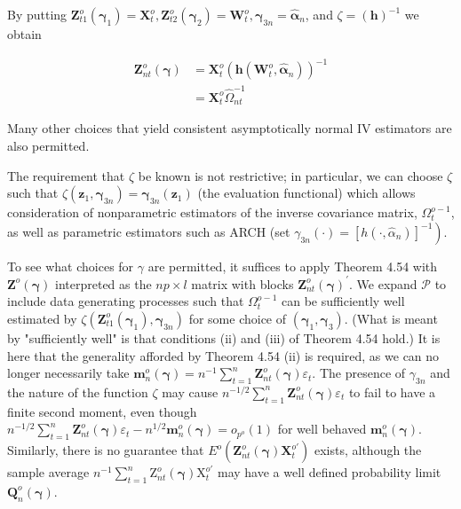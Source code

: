 \documentclass[10pt]{article}
\begin{document}
By putting $\mathbf{Z}_{t 1}^{o}\left(\boldsymbol{\gamma}_{1}\right)=\mathbf{X}_{t}^{o}, \mathbf{Z}_{t 2}^{o}\left(\boldsymbol{\gamma}_{2}\right)=\mathbf{W}_{t}^{o}, \boldsymbol{\gamma}_{3 n}=\hat{\boldsymbol{\alpha}}_{n}$, and $\zeta=(\mathbf{h})^{-1}$ we obtain

$$
\begin{aligned}
\mathbf{Z}_{n t}^{o}(\boldsymbol{\gamma}) & =\mathbf{X}_{t}^{o}\left(\mathbf{h}\left(\mathbf{W}_{t}^{o}, \hat{\boldsymbol{\alpha}}_{n}\right)\right)^{-1} \\
& =\mathbf{X}_{t}^{o} \hat{\Omega}_{n t}^{-1}
\end{aligned}
$$

Many other choices that yield consistent asymptotically normal IV estimators are also permitted.

The requirement that $\zeta$ be known is not restrictive; in particular, we can choose $\zeta$ such that $\zeta\left(\mathbf{z}_{1}, \boldsymbol{\gamma}_{3 n}\right)=\boldsymbol{\gamma}_{3 n}\left(\mathbf{z}_{1}\right)$ (the evaluation functional) which allows consideration of nonparametric estimators of the inverse covariance matrix, $\Omega_{t}^{o-1}$, as well as parametric estimators such as ARCH (set $\gamma_{3 n}(\cdot)= \left.\left[h\left(\cdot, \hat{\alpha}_{n}\right)\right]^{-1}\right)$.

To see what choices for $\gamma$ are permitted, it suffices to apply Theorem 4.54 with $\mathbf{Z}^{o}(\boldsymbol{\gamma})$ interpreted as the $n p \times l$ matrix with blocks $\mathbf{Z}_{n t}^{o}(\boldsymbol{\gamma})^{\prime}$. We expand $\mathcal{P}$ to include data generating processes such that $\Omega_{t}^{o-1}$ can be sufficiently well estimated by $\zeta\left(\mathbf{Z}_{t 1}^{o}\left(\boldsymbol{\gamma}_{1}\right), \boldsymbol{\gamma}_{3 n}\right)$ for some choice of $\left(\boldsymbol{\gamma}_{1}, \boldsymbol{\gamma}_{3}\right)$. (What is meant by "sufficiently well" is that conditions (ii) and (iii) of Theorem 4.54 hold.) It is here that the generality afforded by Theorem 4.54 (ii) is required, as we can no longer necessarily take $\mathbf{m}_{n}^{o}(\boldsymbol{\gamma})= n^{-1} \sum_{t=1}^{n} \mathbf{Z}_{n t}^{o}(\boldsymbol{\gamma}) \varepsilon_{t}$. The presence of $\gamma_{3 n}$ and the nature of the function $\zeta$ may cause $n^{-1 / 2} \sum_{t=1}^{n} \mathbf{Z}_{n t}^{o}(\boldsymbol{\gamma}) \varepsilon_{t}$ to fail to have a finite second moment, even though $n^{-1 / 2} \sum_{t=1}^{n} \mathbf{Z}_{n t}^{o}(\boldsymbol{\gamma}) \varepsilon_{t}-n^{1 / 2} \mathbf{m}_{n}^{o}(\boldsymbol{\gamma})=o_{p^{o}}(1)$ for well behaved $\mathbf{m}_{n}^{o}(\boldsymbol{\gamma})$. Similarly, there is no guarantee that $E^{o}\left(\mathbf{Z}_{n t}^{o}(\boldsymbol{\gamma}) \mathbf{X}_{t}^{o \prime}\right)$ exists, although the sample average $n^{-1} \sum_{t=1}^{n} \mathrm{Z}_{n t}^{o}(\boldsymbol{\gamma}) \mathrm{X}_{t}^{o \prime}$ may have a well defined probability limit $\mathbf{Q}_{n}^{o}(\boldsymbol{\gamma})$.
\end{document}
